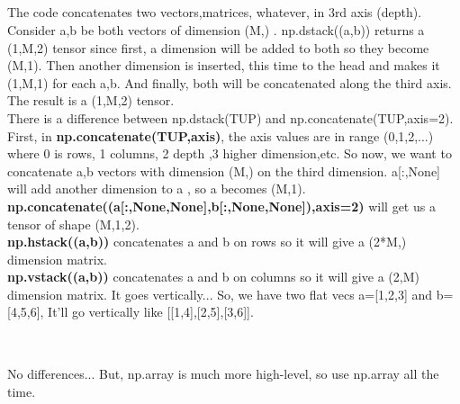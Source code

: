 \documentclass[a4paper,18pt]{article}
\begin{document}

\subsection{\colorbox {matgreen}{\color{white}{\large np.dstack(TUP)}}}
The code concatenates two vectors,matrices, whatever, in 3rd axis (depth). Consider a,b be both vectors of dimension (M,) . np.dstack((a,b)) returns a (1,M,2) tensor since first, a dimension will be added to both so they become (M,1). Then another dimension is inserted, this time to the head and makes it (1,M,1) for each a,b. And finally, both will be concatenated along the third axis. The result is a (1,M,2) tensor.\\

There is a difference between np.dstack(TUP) and np.concatenate(TUP,axis=2). First, in \textbf{np.concatenate(TUP,axis)}, the axis values are in range (0,1,2,...) where 0 is rows, 1 columns, 2 depth ,3 higher dimension,etc. So now, we want to concatenate a,b vectors with dimension (M,) on the third dimension. a[:,None] will add another dimension to a , so a becomes (M,1).  \textbf{np.concatenate((a[:,None,None],b[:,None,None]),axis=2)} will get us a tensor of shape (M,1,2).\\

\textbf{np.hstack((a,b))} concatenates a and b on rows so it will give a (2*M,) dimension matrix.\\

\textbf{np.vstack((a,b))} concatenates a and b on columns so it will give a (2,M) dimension matrix. It goes vertically... So, we have two flat vecs a=[1,2,3] and b=[4,5,6],
It'll go vertically like [[1,4],[2,5],[3,6]].\\\\


\subsection{\colorbox {matgreen}{\color{white}{\large np.ndarray VS np.array}}}
No differences... But, np.array is much more high-level, so use np.array all the time.

\end{document}
